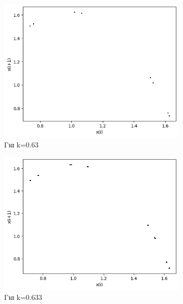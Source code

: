 \begin{figure}[h!]
\begin{subfigure}[b]{0.25\textwidth}
		\includegraphics[width=\textwidth]{LateX images/graphs q09/g13}
		\caption{Για k=0.63}
		\label{f:k52}
	\end{subfigure}
	\hfill
	\begin{subfigure}[b]{0.25\textwidth}
		\centering
		\includegraphics[width=\textwidth]{LateX images/graphs q09/g7}
		\caption{Για k=0.633}
		\label{f:k53}
	\end{subfigure}
	\hfill
	\begin{subfigure}[b]{0.25\textwidth}
		\centering

\end{subfigure}
\end{figure}

